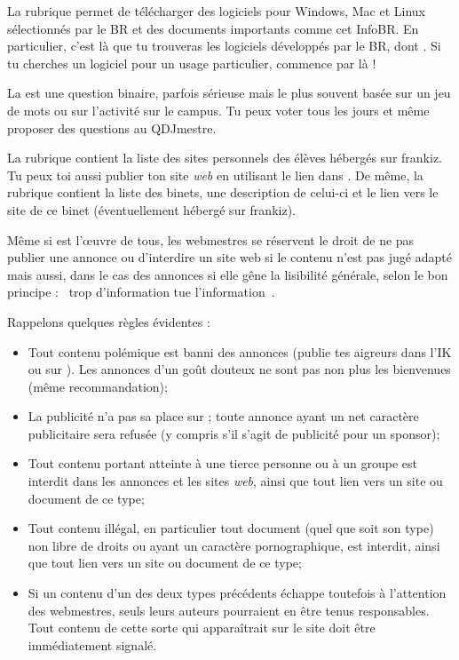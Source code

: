 La rubrique  permet de télécharger des logiciels pour
Windows, Mac et Linux sélectionnés par le BR et des documents
importants comme cet InfoBR. En particulier, c'est là que tu
trouveras les logiciels développés par le BR, dont . Si
tu cherches un logiciel pour un usage particulier, commence par là !


La  est une question binaire, parfois sérieuse mais le
plus souvent basée sur un jeu de mots ou sur l'activité sur le
campus. Tu peux voter tous les jours et même proposer des questions
au QDJmestre.

La rubrique  contient la liste des sites personnels des élèves hébergés sur frankiz. Tu peux toi aussi publier ton site \emph{web} en
utilisant le lien dans . De même, la rubrique  contient la liste des binets, une description de celui-ci et le lien
vers le site de ce binet (éventuellement hébergé sur frankiz).

Même si \fkz est l'\oe uvre de tous, les webmestres se réservent le droit de ne pas publier une annonce ou d'interdire un site web si le contenu
n'est pas jugé adapté mais aussi, dans le cas des annonces si elle gêne la lisibilité générale, selon le bon principe : \guillemotleft~trop
d'information tue l'information~\guillemotright .

Rappelons quelques règles évidentes :
\begin{itemize}
 \item Tout contenu polémique est banni des annonces (publie tes aigreurs dans l'IK ou sur ).
       Les annonces d'un go\^ut douteux ne sont pas non plus les bienvenues (même recommandation);
 \item La publicité n'a pas sa place sur \fkz ; toute annonce ayant un net caractère publicitaire
       sera refusée (y compris s'il s'agit de publicité pour un sponsor);
 \item Tout contenu portant atteinte à une tierce personne ou à un groupe est interdit dans les annonces
       et les sites \emph{web}, ainsi que tout lien vers un site ou document de ce type;
 \item Tout contenu illégal, en particulier tout document (quel que soit son type)
       non libre de droits ou ayant un caractère pornographique, est interdit,
       ainsi que tout lien vers un site ou document de ce type;
 \item Si un contenu d'un des deux types précédents échappe toutefois à l'attention des webmestres,
       seuls leurs auteurs pourraient en être tenus responsables.
       Tout contenu de cette sorte qui apparaîtrait sur le site doit être immédiatement signalé.
\end{itemize}

